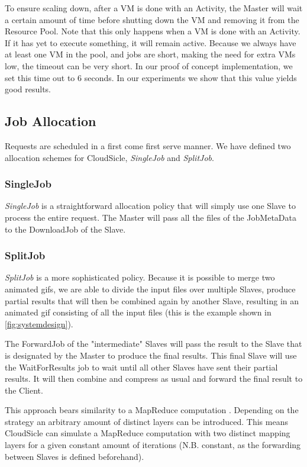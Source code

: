 \documentclass[twocolumn,twoside]{IEEEtran}
\begin{document}
To ensure scaling down, after a VM is done with an Activity, the Master will wait a certain amount of time before shutting down the VM and removing it from the Resource Pool. Note that this only happens when a VM is done with an Activity. If it has yet to execute something, it will remain active. Because we always have at least one VM in the pool, and jobs are short, making the need for extra VMs low, the timeout can be very short. In  our proof of concept implementation, we set this time out to 6 seconds. In our experiments we show that this value yields good results.

\subsection{Job Allocation}
Requests are scheduled in a first come first serve manner. We have defined two allocation schemes for CloudSicle, \emph{SingleJob} and \emph{SplitJob}.
\subsubsection{SingleJob} 
\emph{SingleJob} is a straightforward allocation policy that will simply use one Slave to process the entire request. The Master will pass all the files of the JobMetaData to the DownloadJob of the Slave.
\subsubsection{SplitJob}
\emph{SplitJob} is a more sophisticated policy. Because it is possible to merge two animated gifs, we are able to divide the input files over multiple Slaves, produce partial results that will then be combined again by another Slave, resulting in an animated gif consisting of all the input files (this is the example shown in \autoref{fig:systemdesign}). 

The ForwardJob of the "intermediate" Slaves will pass the result to the Slave that is designated by the Master to produce the final results. This final Slave will use the WaitForResults job to wait until all other Slaves have sent their partial results. It will then combine and compress as usual and forward the final result to the Client.

This approach bears similarity to a MapReduce computation \cite{MapReduce}.
Depending on the strategy an arbitrary amount of distinct
layers can be introduced. This means CloudSicle can simulate
a MapReduce computation with two distinct mapping layers for
a given constant amount of iterations (N.B. constant, as the forwarding between
Slaves is defined beforehand).
\end{document}
